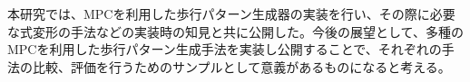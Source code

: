 
本研究では、MPCを利用した歩行パターン生成器の実装を行い、その際に必要な式変形の手法などの実装時の知見と共に公開した。今後の展望として、多種のMPCを利用した歩行パターン生成手法を実装し公開することで、それぞれの手法の比較、評価を行うためのサンプルとして意義があるものになると考える。